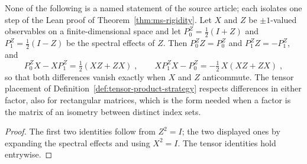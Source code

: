
\begin{lemma}\label{lem:ms-rigidity-support-swap-algebra}
	\leanok
	None of the following is a named statement of the source article; each isolates one step of the Lean proof of Theorem~\ref{thm:ms-rigidity}. Let $X$ and $Z$ be $\pm 1$-valued observables on a finite-dimensional space and let $P^Z_0 = \tfrac12(I + Z)$ and $P^Z_1 = \tfrac12(I - Z)$ be the spectral effects of $Z$. Then $P^Z_0 Z = P^Z_0$ and $P^Z_1 Z = -P^Z_1$, and
	\[
		P^Z_0 X - X P^Z_1 = \tfrac12 (XZ + ZX)\;, \qquad
		X P^Z_1 X - P^Z_0 = -\tfrac12\, X (XZ + ZX)\;,
	\]
	so that both differences vanish exactly when $X$ and $Z$ anticommute. The tensor placement of Definition~\ref{def:tensor-product-strategy} respects differences in either factor, also for rectangular matrices, which is the form needed when a factor is the matrix of an isometry between distinct index sets.
\end{lemma}
\begin{proof}
	\leanok
	The first two identities follow from $Z^2 = I$; the two displayed ones by expanding the spectral effects and using $X^2 = I$. The tensor identities hold entrywise.
\end{proof}


